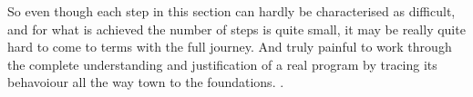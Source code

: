 So even though each step in this section can hardly be characterised as
difficult, and for what is achieved the number of steps is quite small,
it may be really quite hard to come to terms with the full journey. And
truly painful to work through the complete understanding and justification of
a real program by tracing its behavoiour all the way town to the foundations.
.
